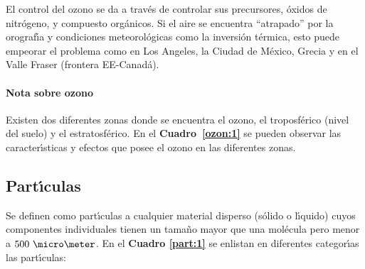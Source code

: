 El control del ozono se da a trav\'es de controlar sus precursores, \'oxidos de nitr\'ogeno, y compuesto org\'anicos. Si el aire se encuentra ``atrapado'' por la
orograf\'{\i}a y condiciones meteorol\'ogicas como la inversi\'on t\'ermica, esto puede empeorar el problema como en  Los Angeles, la Ciudad de M\'exico, Grecia y en el Valle Fraser (frontera EE-Canad\'a).

\paragraph{Nota sobre ozono}
Existen dos diferentes zonas donde se encuentra el ozono, el troposf\'erico (nivel del suelo) y el estratosf\'erico. En el \textbf{Cuadro~\ref{ozon:1}} se pueden observar las
caracter\'{\i}sticas y efectos que posee el ozono en las diferentes zonas.



\subsection{Part\'{\i}culas}
Se definen como part\'{\i}culas a cualquier material disperso (s\'olido o l\'{\i}quido) cuyos componentes individuales tienen un tama\~no mayor que una mol\'e\-cula pero menor a $500\ \micro\meter$.  En el \textbf{Cuadro \ref{part:1}}  se enlistan en diferentes categor\'{\i}as las part\'{\i}culas:


